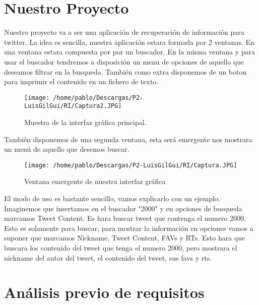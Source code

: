 \section{Nuestro Proyecto}
Nuestro proyecto va a ser una aplicación de recuperación de información para twitter. La idea es sencilla, nuestra aplicación estara formada por 2 ventanas. En una ventana estara compuesta por por un buscador. En la misma ventana y para usar el buscador tendremos a disposición un menu de opciones de aquello que deseamos filtrar en la busqueda. También como extra disponemos de un boton para imprimir el contenido en un fichero de texto.

\begin{figure}[H] %
\centering
\texttt{[image: /home/pablo/Descargas/P2-LuisGilGui/RI/Captura2.JPG]}  %
\caption{Muestra de la interfaz gráfica principal.}\label{figura1}
\end{figure}

También disponemos de una segunda ventana, esta será emergente nos mostrara un menú de aquello que desemos buscar.

\begin{figure}[H] %
\centering
\texttt{[image: /home/pablo/Descargas/P2-LuisGilGui/RI/Captura.JPG]}  %
\caption{Ventana emergente de nuestra interfaz gráfica}\label{figura1}
\end{figure}

El modo de uso es bastante sencillo, vamos explicarlo con un ejemplo. Imaginemos que insertamos en el buscador "2000" y en opciones de busqueda marcamos Tweet Content. Es hara buscar tweet que contenga el numero 2000. Esto es solamente para buscar, para mostrar la información en opciones vamos a suponer que marcamos Nickname, Tweet Content, FAVs y RTs. Esto hara que buscara los contenido del tweet que tenga el numero 2000, pero mostrara el nickname del autor del tweet, el contenido del tweet, sus favs y rts.

\section{Análisis previo de requisitos}

